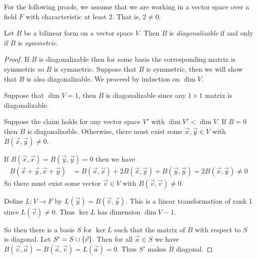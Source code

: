 \begin{remark}
  For the following proofs, we assume that we are working in a vector space over a field $F$ with characteristic at least 2.
  That is, $2 \ne 0$.
\end{remark}

\begin{theorem}
  Let $B$ be a bilinear form on a vector space $V$. Then $B$ is \emph{diagonalizable} if and only if $B$ is \emph{symmetric}.
\end{theorem}
\begin{proof}
  If $B$ is diagonalizable then for some basis the corresponding matrix is symmetric so $B$ is symmetric.
  Suppose that $B$ is symmetric, then we will show that $B$ is also diagonalizable.
  We proceed by induction on $\dim V$.

  Suppose that $\dim V = 1$, then $B$ is diagonalizable since any $1 \times 1$ matrix is diagonalizable.

  Suppose the claim holds for any vector space $V'$ with $\dim V' < \dim V$.
  If $B = 0$ then $B$ is diagonalizable. Otherwise, there must exist some $\vec x, \vec y \in V$ with $B(\vec x, \vec y) \ne 0$.

  If $B(\vec x, \vec x) = B(\vec y, \vec y) = 0$ then we have
    \begin{align}
      B(\vec x + \vec y, \vec x + \vec y)
        &= B(\vec x, \vec x) + 2B(\vec x, \vec y) + B(\vec y, \vec y) = 2B(\vec x, \vec y) \ne 0
    \end{align}
  So there must exist some vector $\vec v \in V$ with $B(\vec v, \vec v) \ne 0$.

  Define $L : V \to F$ by $L(\vec y) = B(\vec v, \vec y)$. This is a linear transformation of rank 1 since $L(\vec v) \ne 0$.
  Thus $\ker L$ has dimension $\dim V - 1$.

  So then there is a basis $S$ for $\ker L$ such that the matrix of $B$ with respect to $S$ is diagonal.
  Let $S' = S \cup \left\{ \vec v \right\}$. Then for all $\vec a \in S$ we have $B(\vec v, \vec a) = B(\vec a, \vec v) = L(\vec a) = 0$.
  Thus $S'$ makes $B$ diagonal.
\end{proof}
